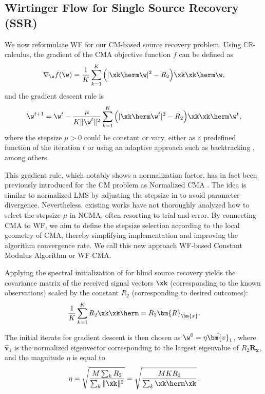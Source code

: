 \subsection{Wirtinger Flow for Single Source Recovery (SSR)}
We now reformulate WF for our CM-based source recovery problem. Using $\mathbb{CR}$-calculus, the gradient of the CMA objective function $f$ can be defined as
\begin{equation}
\nabla_{\w}f(\w)=\frac{1}{K}\sum_{k=1}^K\Big(|\xk\herm\w|^2-R_2\Big)\xk\xk\herm\w, \label{wfcma:eqn:wfgradient}
\end{equation}
and the gradient descent rule is 
\begin{equation}
\w^{t+1}=\w^t-\frac{\mu}{K\|\w^t\|^2}\sum_{k=1}^K\Big(|\xk\herm\w^t|^2-R_2\Big)\xk\xk\herm\w^t, \label{wfcma:eqn:wfupdaterule}
\end{equation}
where the stepsize $\mu>0$ could be constant or vary, 
either as a predefined function of the iteration $t$ \cite{Candes2015a_phaseretrievalWF} or 
using an adaptive approach such as backtracking \cite{Armijo1966}, among others.

This gradient rule, which notably shows a normalization factor, has in fact been previously introduced for the CM problem as Normalized CMA \cite{Jones1995ncma,Tanrikulu1997ncma,Dogancay2001ncmapartialupdates}. 
The idea is similar to normalized LMS by adjusting the stepsize in to avoid parameter divergence. 
Nevertheless, existing works have not thoroughly analyzed how to select the stepsize $\mu$ in NCMA, often resorting to trial-and-error. By connecting CMA to WF, we aim to define the stepsize selection according to the local geometry of CMA, thereby simplifying implementation and improving the algorithm convergence rate. 
We call this new approach WF-based Constant Modulus Algorithm or WF-CMA.

Applying the spectral initialization of \cite{Candes2015a_phaseretrievalWF} for blind source recovery yields the covariance matrix of the received signal vectors $\xk$ (corresponding to the known observations) scaled by the constant $R_2$ (corresponding to desired outcomes):
\begin{equation}
\frac{1}{K}\sum_{k=1}^KR_2\xk\xk\herm=R_2\bm{R}_{\bm{x}}. \label{wfcma:eqn:init_matrix}
\end{equation}

The initial iterate for gradient descent is then chosen as $\w^0=\eta\hat{\bm{v}}_1$, where $\hat{\bm{v}}_1$ is the normalized eigenvector corresponding to the largest eigenvalue of $R_2\bm{R}_{\bm{x}}$, and the magnitude $\eta$ is equal to
\begin{equation}
\eta=\sqrt{\frac{M\sum_{k}R_2}{\sum_k \|\xk\|^2}}=\sqrt{\frac{MKR_2}{\sum_k \xk\herm\xk}}.
\end{equation}


